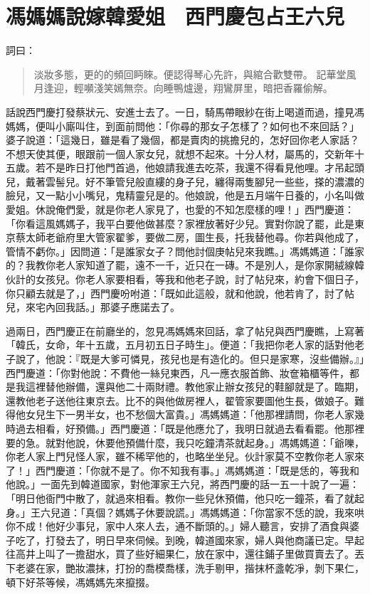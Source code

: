 
\chapter{馮媽媽說嫁韓愛姐　西門慶包占王六兒}

詞曰：
\begin{quote}
淡妝多態，更的的頻回眄睞。便認得琴心先許，與綰合歡雙帶。
記華堂風月逢迎，輕嚬淺笑嫣無奈。向睡鴨爐邊，翔鸞屏里，暗把香羅偷解。
\end{quote}

話說西門慶打發蔡狀元、安進士去了。一日，騎馬帶眼紗在街上喝道而過，撞見馮媽媽，便叫小廝叫住，到面前問他：「你尋的那女子怎樣了？如何也不來回話？」婆子說道：「這幾日，雖是看了幾個，都是賣肉的挑擔兒的，怎好回你老人家話？不想天使其便，眼跟前一個人家女兒，就想不起來。十分人材，屬馬的，交新年十五歲。若不是昨日打他門首過，他娘請我進去吃茶，我還不得看見他哩。才吊起頭兒，戴著雲髻兒。好不筆管兒般直縷的身子兒，纏得兩隻腳兒一些些，搽的濃濃的臉兒，又一點小小嘴兒，鬼精靈兒是的。他娘說，他是五月端午日養的，小名叫做愛姐。休說俺們愛，就是你老人家見了，也愛的不知怎麼樣的哩！」西門慶道：「你看這風媽媽子，我平白要他做甚麼？家裡放著好少兒。實對你說了罷，此是東京蔡太師老爺府里大管家翟爹，要做二房，圖生長，托我替他尋。你若與他成了，管情不虧你。」因問道：「是誰家女子？問他討個庚帖兒來我瞧。」馮媽媽道：「誰家的？我教你老人家知道了罷，遠不一千，近只在一磚。不是別人，是你家開絨線韓伙計的女孩兒。你老人家要相看，等我和他老子說，討了帖兒來，約會下個日子，你只顧去就是了，」西門慶吩咐道：「既如此這般，就和他說，他若肯了，討了帖兒，來宅內回我話。」那婆子應諾去了。

過兩日，西門慶正在前廳坐的，忽見馮媽媽來回話，拿了帖兒與西門慶瞧，上寫著「韓氏，女命，年十五歲，五月初五日子時生」。便道：「我把你老人家的話對他老子說了，他說：『既是大爹可憐見，孩兒也是有造化的。但只是家寒，沒些備辦。』」西門慶道：「你對他說：不費他一絲兒東西，凡一應衣服首飾、妝奩箱櫃等件，都是我這裡替他辦備，還與他二十兩財禮。教他家止辦女孩兒的鞋腳就是了。臨期，還教他老子送他往東京去。比不的與他做房裡人，翟管家要圖他生長，做娘子。難得他女兒生下一男半女，也不愁個大富貴。」馮媽媽道：「他那裡請問，你老人家幾時過去相看，好預備。」西門慶道：「既是他應允了，我明日就過去看看罷。他那裡要的急。就對他說，休要他預備什麼，我只吃鐘清茶就起身。」馮媽媽道：「爺嚛，你老人家上門兒怪人家，雖不稀罕他的，也略坐坐兒。伙計家莫不空教你老人家來了！」西門慶道：「你就不是了。你不知我有事。」馮媽媽道：「既是恁的，等我和他說。」一面先到韓道國家，對他渾家王六兒，將西門慶的話一五一十說了一遍：「明日他衙門中散了，就過來相看。教你一些兒休預備，他只吃一鐘茶，看了就起身。」王六兒道：「真個？媽媽子休要說謊。」馮媽媽道：「你當家不恁的說，我來哄你不成！他好少事兒，家中人來人去，通不斷頭的。」婦人聽言，安排了酒食與婆子吃了，打發去了，明日早來伺候。到晚，韓道國來家，婦人與他商議已定。早起往高井上叫了一擔甜水，買了些好細果仁，放在家中，還往鋪子里做買賣去了。丟下老婆在家，艷妝濃抹，打扮的喬模喬樣，洗手剔甲，揩抹杯盞乾凈，剝下果仁，頓下好茶等候，馮媽媽先來攛掇。

